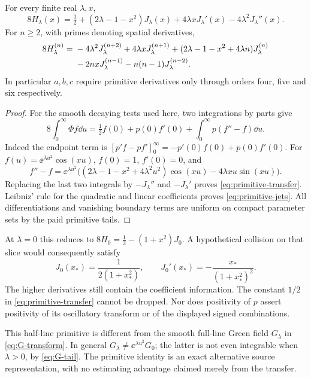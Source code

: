\begin{proposition}\label{prop:primitive-transfer}
For every finite real \(\lambda,x\),
\begin{equation}\label{eq:primitive-transfer}
 8H_\lambda(x)=\tfrac12+(2\lambda-1-x^2)J_\lambda(x)
       +4\lambda xJ_\lambda'(x)-4\lambda^2J_\lambda''(x).
\end{equation}
For \(n\ge2\), with primes denoting spatial derivatives,
\begin{align}
 8H_\lambda^{(n)}={}&-4\lambda^2J_\lambda^{(n+2)}
 +4\lambda xJ_\lambda^{(n+1)}
 +(2\lambda-1-x^2+4\lambda n)J_\lambda^{(n)}\notag\\
 &-2nxJ_\lambda^{(n-1)}-n(n-1)J_\lambda^{(n-2)}.
 \label{eq:primitive-jets}
\end{align}
In particular \(a,b,c\) require primitive derivatives only through
orders four, five and six respectively.
\end{proposition}
\begin{proof}
For the smooth decaying tests used here, two integrations by parts give
\begin{equation}\label{eq:primitive-IBP}
 8\int_0^\infty\Phi f\dd u
 =\tfrac12 f(0)+p(0)f'(0)
       +\int_0^\infty p(f''-f)\dd u.
\end{equation}
Indeed the endpoint term is
\([p'f-pf']_0^\infty=-p'(0)f(0)+p(0)f'(0)\).
For \(f(u)=\ee^{\lambda u^2}\cos(xu)\), \(f(0)=1\), \(f'(0)=0\),
and
\[
 f''-f=\ee^{\lambda u^2}
 \bigl((2\lambda-1-x^2+4\lambda^2u^2)\cos(xu)
                   -4\lambda xu\sin(xu)\bigr).
\]
Replacing the last two integrals by \(-J_\lambda''\) and
\(-J_\lambda'\) proves \eqref{eq:primitive-transfer}.
Leibniz' rule for the quadratic and linear coefficients proves
\eqref{eq:primitive-jets}. All differentiations and vanishing
boundary terms are uniform on compact parameter sets by the paid
primitive tails.
\end{proof}

At \(\lambda=0\) this reduces to
\(8H_0=\tfrac12-(1+x^2)J_0\). A hypothetical collision on that
slice would consequently satisfy
\[
 J_0(x_*)=\frac{1}{2(1+x_*^2)},\qquad
 J_0'(x_*)=-\frac{x_*}{(1+x_*^2)^2}.
\]
The higher derivatives still contain the coefficient information.
The constant \(1/2\) in \eqref{eq:primitive-transfer} cannot be
dropped. Nor does positivity of \(p\) assert positivity of its
oscillatory transform or of the displayed signed combinations.

This half-line primitive is different from the smooth full-line
Green field \(G_\lambda\) in \eqref{eq:G-transform}.
In general \(G_\lambda\ne\ee^{\lambda u^2}G_0\); the latter is
not even integrable when \(\lambda>0\), by \eqref{eq:G-tail}.
The primitive identity is an exact alternative source representation,
with no estimating advantage claimed merely from the transfer.

